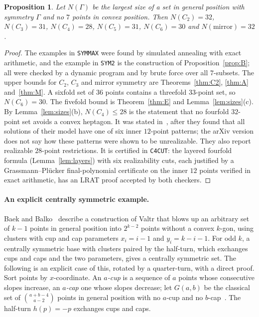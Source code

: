 \documentclass[11pt]{article}
\newtheorem{proposition}[theorem]{Proposition}
\theoremstyle{remark}
\begin{document}
\begin{proposition}\label{prop:C}
Let $N(\Gamma)$ be the largest size of a set in general position with symmetry $\Gamma$ and no $7$ points in convex
position. Then $N(C_2)=32$, $N(C_3)=31$, $N(C_4)=28$, $N(C_5)=31$, $N(C_6)=30$ and $N(\text{mirror})=32$.
\end{proposition}
\begin{proof}
The examples in \texttt{SYMMAX} were found by simulated annealing with exact arithmetic, and the example in \texttt{SYM2}
is the construction of Proposition~\ref{prop:B}; all were checked by a dynamic program and by brute force over all
$7$-subsets. The upper bounds for $C_2$, $C_3$ and mirror symmetry are Theorems~\ref{thm:C2}, \ref{thm:A}
and~\ref{thm:M}. A sixfold set of $36$ points contains a threefold $33$-point set, so $N(C_6)=30$. The fivefold bound is
Theorem~\ref{thm:E} and Lemma~\ref{lem:sizes}(c). By Lemma~\ref{lem:sizes}(b), $N(C_4)\le28$ is the statement that no
fourfold $32$-point set avoids a convex heptagon. It was stated in~\cite[\S6.2]{SMQH25}, after they found that all
solutions of their model have one of six inner $12$-point patterns; the arXiv version does not say how these patterns
were shown to be unrealizable. They also report realizable $28$-point restrictions. It is certified in
\texttt{C4CUT}: the layered fourfold formula (Lemma~\ref{lem:layers}) with six realizability cuts, each justified by a
Grassmann--Pl\"ucker final-polynomial certificate on the inner $12$ points verified in exact arithmetic, has an LRAT proof
accepted by both checkers.
\end{proof}

\paragraph{An explicit centrally symmetric example.} Baek and Balko~\cite[Definition~13, Lemma~14 and \S6.1]{BB25}
describe a construction of Valtr that blows up an arbitrary set of $k-1$ points in general position into $2^{k-2}$ points
without a convex $k$-gon, using clusters with cup and cap parameters $x_i=i-1$ and $y_i=k-i-1$. For odd $k$, a
centrally symmetric base with clusters paired by the half-turn, which exchanges cups and caps and the two parameters,
gives a centrally symmetric set. The following is an explicit case of this, rotated by a quarter-turn, with a direct
proof. Sort points by $x$-coordinate. An \emph{$a$-cup} is a sequence of $a$ points whose consecutive slopes increase,
an \emph{$a$-cap} one whose slopes decrease; let $G(a,b)$ be the classical set of $\binom{a+b-4}{a-2}$ points in general
position with no $a$-cup and no $b$-cap~\cite{ES35}. The half-turn $h(p)=-p$ exchanges cups and caps.
\end{document}
